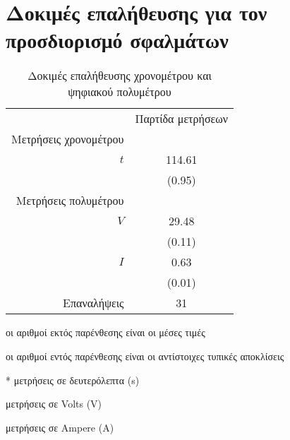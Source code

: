 \chapter[Δοκιμές επαλήθευσης]{Δοκιμές επαλήθευσης για τον προσδιορισμό σφαλμάτων}\label{app:actualitydata} 


\begin{table}[h!]
\centering
{}
\begin{threeparttable}
\caption{Δοκιμές επαλήθευσης χρονομέτρου και ψηφιακού πολυμέτρου}
\label{tab:rep1}
\begin{tabular}{@{}r 
                S[table-format=-2.3]
                 @{}}
\toprule
				   & {Παρτίδα μετρήσεων} \\
Μετρήσεις χρονομέτρου\\
$t$\tnote{*}       & 114.61\\
                   & (0.95)\\

Μετρήσεις πολυμέτρου\\
$V$\tnote{\dag}  	   & 29.48\\
                   & (0.11)\\
\addlinespace
$I$\tnote{\ddag}     & 0.63\\
                   & (0.01)\\
\midrule
Επαναλήψεις		   & 31\\
\bottomrule
\end{tabular}
    \smallskip
    \footnotesize
οι αριθμοί εκτός παρένθεσης είναι οι μέσες τιμές\par
οι αριθμοί εντός παρένθεσης είναι οι αντίστοιχες τυπικές αποκλίσεις\par
\begin{tablenotes}
\item[*]    μετρήσεις σε δευτερόλεπτα (\unit{\second})
\item[\dag]   μετρήσεις σε Volts (\unit{\volt})
\item[\ddag]  μετρήσεις σε Ampere (\unit{\ampere})
\end{tablenotes}
\end{threeparttable}
\end{table}


